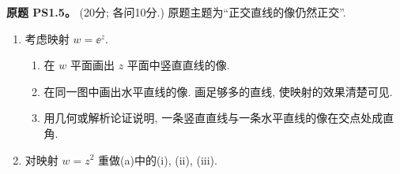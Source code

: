 \begin{exercise}\label{ass:ps1-5}
\textbf{原题 PS1.5。} (20分; 各问10分.) 原题主题为“正交直线的像仍然正交”.
\begin{enumerate}[label=(\alph*)]
\item 考虑映射 $w=\ee^z$.
\begin{enumerate}[label=(\roman*)]
\item 在 $w$ 平面画出 $z$ 平面中竖直直线的像.
\item 在同一图中画出水平直线的像. 画足够多的直线, 使映射的效果清楚可见.
\item 用几何或解析论证说明, 一条竖直直线与一条水平直线的像在交点处成直角.
\end{enumerate}
\item 对映射 $w=z^2$ 重做(a)中的(i), (ii), (iii).
\end{enumerate}
\end{exercise}
